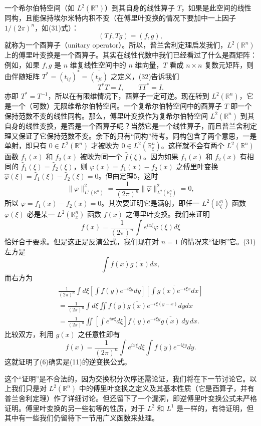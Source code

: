 一个希尔伯特空间（如 $L^2(\mathbb R^n)$）到其自身的线性算子 $T$，如果是此空间的线性同构，且能保持埃尔米特内积不变（在傅里叶变换的情况下要加中一上因子 $1/(2\pi)^n$，如(31)式）：
\begin{equation}
 (Tf,Tg)=(f,g),
 \tag{32}
\end{equation}
就称为一个酉算子（unitary operator）。所以，普兰舍利定理启发我们，$L^2(\mathbb R^n)$ 上的傅里叶变换是一个酉算子。其实在线性代数中我们已经看过了什么是酉矩阵：例如，如果 $f,g$ 是 $n$ 维复线性空间中的 $n$ 维向量，$T$ 看成 $n\times n$ 复数元矩阵，则由伴随矩阵 $T^*=(t_{ij})^*=\overline{(t_{ji})}$ 之定义，(32)告诉我们
\[
 T^*T=I,\qquad TT^*=I.
\]
亦即 $T^*=T^{-1}$，所以在有限维情况下，酉算子一定可逆。现在转到 $L^2(\mathbb R^n)$，它是一个（可数）无限维希尔伯特空间。一个复希尔伯特空间中的酉算子 $T$ 即一个保持范数不变的线性同构。那么，傅里叶变换作为复希尔伯特空间 $L^2(\mathbb R^n)$ 到其自身的线性变换，是否是一个酉算子呢？当然它是一个线性算子，而且普兰舍利定理又保证了它保持范数不变。余下的只有“同构”待考。同构包含了两个意思，一是单射，即只有 $0\in L^2(\mathbb R^n)$ 才被映为 $0\in L^2(\mathbb R_\xi^n)$。这样就不会有两个 $L^2(\mathbb R^n)$ 函数 $f_1(x)$ 和 $f_2(x)$ 被映为同一个 $\widehat f(\xi)$。因为如果 $f_1(x)$ 和 $f_2(x)$ 有相同的 $\widehat f_1(\xi)=\widehat f_2(\xi)$，则 $\varphi(x)=f_1(x)-f_2(x)$ 之傅里叶变换 $\widehat\varphi(\xi)=\widehat f_1(\xi)-\widehat f_2(\xi)=0$。但由定理5，这时
\[
 \|\varphi\|_{L^2(\mathbb R^n)}^2=\frac1{(2\pi)^n}\|\widehat\varphi\|_{L^2(\mathbb R_\xi^n)}^2=0,
\]
所以 $\varphi=f_1(x)-f_2(x)=0$。其次要证明它是满射，即任一 $L^2(\mathbb R_\xi^n)$ 函数 $\varphi(\xi)$ 必是某一 $L^2(\mathbb R_x^n)$ 函数 $f(x)$ 之傅里叶变换。我们来证明
\[
 f(x)=\frac1{(2\pi)^n}\int e^{ix\xi}\varphi(\xi)d\xi
\]
恰好合于要求。但是这正是反演公式，我们现在对 $n=1$ 的情况来“证明”它。(31)左方是
\[
 \int f(x)\overline{g(x)}dx,
\]
而右方为
\[
 \begin{aligned}
 \frac1{(2\pi)^n}\int d\xi
 \left[\int f(y)e^{-i\xi y}dy\right]
 \overline{\left[\int g(x)e^{-i\xi x}dx\right]}\\
 =\frac1{(2\pi)^n}\int d\xi\iint f(y)\overline{g(x)}e^{-i\xi(y-x)}dydx\\
 =\frac1{(2\pi)^n}\iint\left[\int e^{ix\xi}d\xi\right]
 f(y)e^{-i\xi y}\overline{g(x)}\,dy\,dx.
 \end{aligned}
\]
比较双方，利用 $g(x)$ 之任意性即有
\[
 f(x)=\frac1{(2\pi)^n}\int e^{ix\xi}d\xi\int f(y)e^{-i\xi y}dy.
\]
这就证明了(6)确实是(11)的逆变换公式。

这个“证明”是不合法的，因为交换积分次序还需论证，我们将在下一节讨论它。以上我们只是对 $L^2(\mathbb R^n)$ 中的傅里叶变换之定义及其基本性质（它是酉算子，并有普兰舍利定理）作了详细讨论。但还留下了一个漏洞，即逆傅里叶变换公式未严格证明。傅里叶变换的另一些初等的性质，对于 $L^2$ 和 $L^1$ 是一样的，有待证明，但其中有一些我们仍留待下一节用广义函数来处理。

